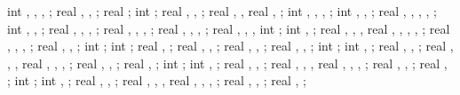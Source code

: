 {{int \showshearwall, \shearwallbay, \shearwallstartcolumn, \shearwallendcolumn;
real \shearwallstartx, \shearwallstarty \shearwalldeltax, \shearwalldeltay;
real \shearwalllinet;
int \showmarksuper;
real \marksuperexspace, \marksuperrad, \marksuperlinet;
real \marksuperleftstartx, \marksuperleftstarty,
real \marksuperdeltax, \marksuperdeltay;
int \leftstory, \leftlevel, \rightstory, \rightlevel;
int \leftopenstory, \rightopenstory, \showopenstory;
real \leftwallh, \leftopenh, \rightwallh, \rightopenh, \diffwallh;
int \showphorizontalsprings, \phorspringnumber, \phorspringdir;
real \phorspbtwspr, \phorspringspace, \phorspringstartratio, \phorspringendratio;
real \phortextshiftx, \phortextshifty, \phorprelenratio, \phorpostlenratio;
real \phorsegm, \phorsprwid, \phorsprscale, \phorsprlinethk;
real \phorsuppwidth, \phorsuppdepth, \phorsupplinethk,
int \phorshowsuppshade;
int \showpverticalsprings, \pverspringnumber;
real \pverspringspace, \pverspringstartratio, \pverspringendratio,
real \pvertextshiftx, \pvertextshifty, \pverspringlength, \pverprelenratio, \pverpostlenratio;
real \pverampl, \pversegm, \pverspringscale, \pverspringthk;
real \pversuppwidth, \pversuppdepth, \pversupplinethk;
int \pvershowsuppshade;
int \showpaxialspring;
real \pvertextshiftx, \pvertextshifty;
real \paxialspringlength, \paxialspringprelenratio, \paxialspringpostlenratio;
real \paxialspringsegm, \paxialspringwidth, \paxialspringlinethk;
real \paxialsuppwidth, \paxialsuppdepth, \paxialsupplinethk;
int \paxialshowsuppshade;
int \leftwshowsprings, \leftwspringnumber;
real \leftwspringspace, \leftwspringstartratio, \leftwspringendratio;
real \leftwtextshiftx, \leftwtextshifty, \leftwspringlength,
real \leftwprelenratio, \leftwpostlenratio, \leftwampl, \leftwsegm;
real \leftwspringscale, \leftwspringthk, \leftwsuppwidth;
real \leftwsuppdepth, \leftwsupplinethk;
int \leftwshowsuppshade;
int \rightwshowsprings, \rightwspringnumber;
real \rightwspringspace, \rightwspringstartratio, \rightwspringendratio;
real \rightwtextshiftx, \rightwtextshifty, \rightwspringlength,
real \rightwprelenratio, \rightwpostlenratio, \rightwampl, \rightwsegm;
real \rightwspringscale, \rightwspringthk, \rightwsuppwidth;
real \rightwsuppdepth, \rightwsupplinethk;
int \rightwshowsuppshade;
int \foundshowsprings, \foundspringnumber;
real \foundspringspace, \foundspringstartratio, \foundspringendratio;
real \foundtextshiftx, \foundtextshifty, \foundspringlength,
real \foundprelenratio, \foundpostlenratio, \foundampl, \foundsegm;
real \foundspringscale, \foundspringthk, \foundsuppwidth;
real \foundsuppdepth, \foundsupplinethk;
}}
